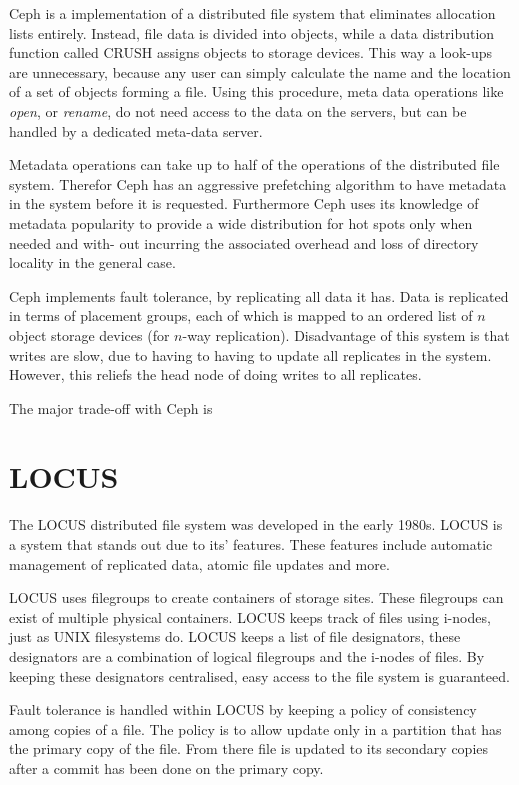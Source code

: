 \documentclass[a4paper,12px]{article}
\begin{document}
Ceph is a implementation of a distributed file system that eliminates allocation
lists entirely. Instead, file data is divided into objects, while a data
distribution function called CRUSH assigns objects to storage devices. This way
a look-ups are unnecessary, because any user can simply calculate the name and
the location of a set of objects forming a file.  Using this procedure, meta
data operations like \textit{open}, or \textit{rename}, do not need access to
the data on the servers, but can be handled by a dedicated meta-data
server\cite{weil2006ceph}.

Metadata operations can take up to half of the operations of the distributed
file system. Therefor Ceph has an aggressive prefetching algorithm to have
metadata in the system before it is requested.  Furthermore Ceph uses its
knowledge of metadata popularity to provide a wide distribution for hot spots
only when needed and with- out incurring the associated overhead and loss of
directory locality in the general case.

Ceph implements fault tolerance, by replicating all data it has. Data is
replicated in terms of placement groups, each of which is mapped to an ordered
list of $n$ object storage devices (for $n$-way replication).
\cite{weil2006ceph} Disadvantage of this system is that writes are slow, due to
having to having to update all replicates in the system. However, this reliefs
the head node of doing writes to all replicates.

The major trade-off with Ceph is %

\section{LOCUS}

The LOCUS distributed file system was developed in the early 1980s. LOCUS is a
system that stands out due to its' features. These features include automatic
management of replicated data, atomic file updates and more. \cite{concepts}

LOCUS uses filegroups to create containers of storage sites. These filegroups
can exist of multiple physical containers. LOCUS keeps track of files using
i-nodes, just as UNIX filesystems do. LOCUS keeps a list of file designators,
these designators are a combination of logical filegroups and the i-nodes of
files. \cite{concepts} By keeping these designators centralised, easy access to
the file system is guaranteed.

Fault tolerance is handled within LOCUS by keeping a policy of consistency among
copies of a file. The policy is to allow update only in a partition that has the
primary copy of the file. From there file is updated to its secondary copies
after a commit has been done on the primary copy.
\end{document}
